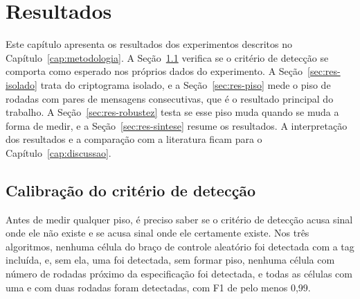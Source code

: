 
\chapter{Resultados}
\label{cap:resultados}

Este capítulo apresenta os resultados dos experimentos descritos no Capítulo~\ref{cap:metodologia}. A Seção~\ref{sec:res-calibracao} verifica se o critério de detecção se comporta como esperado nos próprios dados do experimento. A Seção~\ref{sec:res-isolado} trata do criptograma isolado, e a Seção~\ref{sec:res-piso} mede o piso de rodadas com pares de mensagens consecutivas, que é o resultado principal do trabalho. A Seção~\ref{sec:res-robustez} testa se esse piso muda quando se muda a forma de medir, e a Seção~\ref{sec:res-sintese} resume os resultados. A interpretação dos resultados e a comparação com a literatura ficam para o Capítulo~\ref{cap:discussao}.

\section{Calibração do critério de detecção}
\label{sec:res-calibracao}

Antes de medir qualquer piso, é preciso saber se o critério de detecção acusa sinal onde ele não existe e se acusa sinal onde ele certamente existe. Nos três algoritmos, nenhuma célula do braço de controle aleatório foi detectada com a tag incluída, e, sem ela, uma foi detectada, sem formar piso, nenhuma célula com número de rodadas próximo da especificação foi detectada, e todas as células com uma e com duas rodadas foram detectadas, com F1 de pelo menos 0,99.

